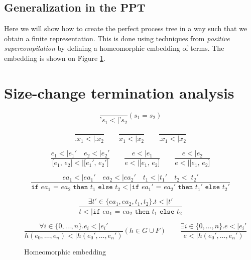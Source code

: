 \documentclass[10pt]{../sigplanconf}
\newcommand{\nfrac}[2]{\frac{\displaystyle{#1}}{\displaystyle{#2}}}
\newcommand{\tagsc}[1]{\tag{\scshape #1}}
\begin{document}
\subsection{Generalization in the PPT}
Here we will show how to create the perfect process tree in a way such
that we obtain a finite representation. This is done using techniques
from \textit{positive supercompilation} by defining a homeomorphic
embedding of terms. The embedding is shown on Figure
\ref{fig:embedding}.

\section{Size-change termination analysis}

\begin{figure}\centering
  \begin{equation}
    \nfrac{
    }{
      \texttt{'}s_1 <| \texttt{'}s_2
    } (s_1 = s_2) \tagsc{Atoms}
  \end{equation}

  \begin{equation}
    \nfrac{
    }{
      \texttt{.}x_1 <| \texttt{.}x_2
    }
    \qquad
    \nfrac{
    }{
      x_1 <| x_2
    }
    \qquad
    \nfrac{
    }{
      \texttt{.}x_1 <| x_2
    } \tagsc{Variables}
  \end{equation}

  \begin{equation}
    \nfrac{
      e_1 <| e_1'\quad e_2 <| e_2'
    }{
      \texttt{[$e_1$, $e_2$]} <| \texttt{[$e_1'$, $e_2'$]}
    }
    \qquad
    \nfrac{
      e <| e_1
    }{
      e <| \texttt{[$e_1$, $e_2$]}
    }
    \qquad
    \nfrac{
      e <| e_2
    }{
      e <| \texttt{[$e_1$, $e_2$]}
    }
    \tagsc{Cons}
  \end{equation}

  \begin{equation}
    \nfrac{
      ea_1 <| ea_1' \quad ea_2 <| ea_2' \quad t_1 <| t_1' \quad t_2 <| t_2'
    }{
      \texttt{if $ea_1$ = $ea_2$ then $t_1$ else $t_2$} <| \texttt{if $ea_1'$ = $ea_2'$ then $t_1'$ else $t_2'$}
    } \tagsc{If-A}
  \end{equation}

  \begin{equation}
    \nfrac{
      \exists t' \in \{ea_1, ea_2, t_1, t_2\}. t <| t'
    }{
      t <| \texttt{if $ea_1$ = $ea_2$ then $t_1$ else $t_2$}
    } \tagsc{If-B}
  \end{equation}

\begin{equation}
  \nfrac{
    \forall i \in \{0, \ldots, n\}. e_i <| e_i'
  }{
    h(e_0, \ldots, e_n) <| h(e_0', \ldots, e_n')
  } (h \in G \cup F)
  \qquad
  \nfrac{
    \exists i \in \{0, \ldots, n\}. e <| e_i'
  }{
    e <| h(e_0', \ldots, e_n')
  }
 \tagsc{Call}
\end{equation}

\caption{Homeomorphic embedding }
\label{fig:embedding}
\end{figure}






\end{document}
